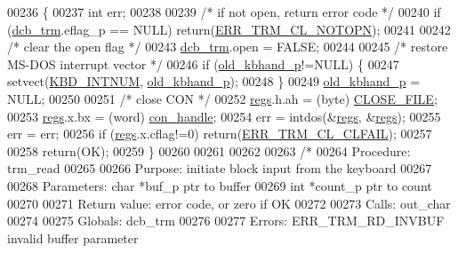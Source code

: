\begin{DoxyCode}
00236 \{
00237         \textcolor{keywordtype}{int}     err;
00238 
00239         \textcolor{comment}{/* if not open, return error code */}
00240         \textcolor{keywordflow}{if} (\hyperlink{trmdrive_8c_aeecf5b41137f812666e981eebea04e61}{dcb_trm}.eflag\_p == NULL) \textcolor{keywordflow}{return}(\hyperlink{trmdrive_8h_a6e8307d1f4ea25f3de1c116588bd2687}{ERR_TRM_CL_NOTOPN});
00241 
00242         \textcolor{comment}{/* clear the open flag */}
00243         \hyperlink{trmdrive_8c_aeecf5b41137f812666e981eebea04e61}{dcb_trm}.open = FALSE;
00244 
00245         \textcolor{comment}{/* restore MS-DOS interrupt vector */}
00246         \textcolor{keywordflow}{if} (\hyperlink{trmdrive_8c_ae0117ec71cfad7cb444a3af48e82db69}{old_kbhand_p}!=NULL) \{
00247                 setvect(\hyperlink{trmdrive_8c_a52651037a009b9f7f5f5c3bc16338855}{KBD_INTNUM}, \hyperlink{trmdrive_8c_ae0117ec71cfad7cb444a3af48e82db69}{old_kbhand_p});
00248         \}
00249         \hyperlink{trmdrive_8c_ae0117ec71cfad7cb444a3af48e82db69}{old_kbhand_p} = NULL;
00250 
00251         \textcolor{comment}{/* close CON */}
00252         \hyperlink{trmdrive_8c_aaf347d1f75c4caba1a02aa49afc9324d}{regs}.h.ah = (byte) \hyperlink{trmdrive_8c_a8621afafdb55c59b3c89f2483dbb96fe}{CLOSE_FILE};
00253         \hyperlink{trmdrive_8c_aaf347d1f75c4caba1a02aa49afc9324d}{regs}.x.bx = (word) \hyperlink{trmdrive_8c_a679f108c9d4e6b006d00e83ec2a4aa96}{con_handle};
00254         err = intdos(&\hyperlink{trmdrive_8c_aaf347d1f75c4caba1a02aa49afc9324d}{regs}, &\hyperlink{trmdrive_8c_aaf347d1f75c4caba1a02aa49afc9324d}{regs});
00255         err = err;
00256         \textcolor{keywordflow}{if} (\hyperlink{trmdrive_8c_aaf347d1f75c4caba1a02aa49afc9324d}{regs}.x.cflag!=0) \textcolor{keywordflow}{return}(\hyperlink{trmdrive_8h_ab39b0610b72802dee7b107f07441c567}{ERR_TRM_CL_CLFAIL});
00257 
00258         \textcolor{keywordflow}{return}(OK);
00259 \}
00260 
00261 
00262 
00263 \textcolor{comment}{/*}
00264 \textcolor{comment}{        Procedure: trm\_read}
00265 \textcolor{comment}{}
00266 \textcolor{comment}{        Purpose: initiate block input from the keyboard}
00267 \textcolor{comment}{}
00268 \textcolor{comment}{        Parameters:     char *buf\_p     ptr to buffer}
00269 \textcolor{comment}{                        int *count\_p ptr to count}
00270 \textcolor{comment}{}
00271 \textcolor{comment}{        Return value: error code, or zero if OK}
00272 \textcolor{comment}{}
00273 \textcolor{comment}{        Calls:  out\_char}
00274 \textcolor{comment}{}
00275 \textcolor{comment}{        Globals: dcb\_trm}
00276 \textcolor{comment}{}
00277 \textcolor{comment}{        Errors: ERR\_TRM\_RD\_INVBUF invalid buffer parameter}

\end{DoxyCode}
